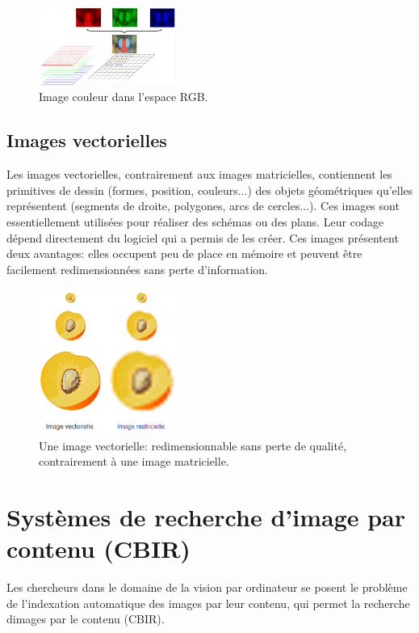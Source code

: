 \begin{figure}[H]
	\centering
	\includegraphics[width=0.4\textwidth]{Figures/rgb} 
	\caption{Image couleur dans l’espace RGB.}
\end{figure}

\subsection{Images vectorielles}

Les images vectorielles, contrairement aux images matricielles, contiennent les primitives de dessin (formes, position, couleurs...) des objets géométriques qu’elles représentent (segments de droite, polygones, arcs de cercles...). Ces images sont essentiellement utilisées pour réaliser des schémas ou des plans. Leur codage dépend directement du logiciel qui a permis de les créer. Ces images présentent deux avantages: elles occupent peu de place en mémoire et peuvent être facilement redimensionnées sans perte d'information.

\begin{figure}[H]
	\centering
	\includegraphics[width=0.4\textwidth]{Figures/vecteur} 
	\caption{Une image vectorielle: redimensionnable sans perte de qualité, contrairement à une image matricielle.}
\end{figure}




\section{Systèmes de recherche d’image par contenu (CBIR)}
Les chercheurs dans le domaine de la vision par ordinateur se posent le problème de l'indexation automatique des images par leur contenu, qui permet la recherche dimages par le
contenu (CBIR).\\

